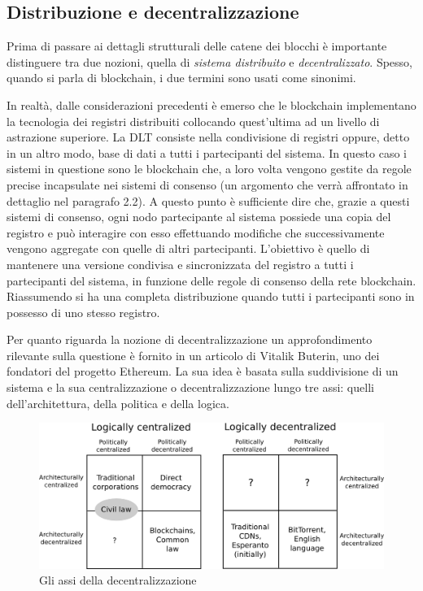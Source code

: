 \subsection{Distribuzione e decentralizzazione}

Prima di passare ai dettagli strutturali delle catene dei blocchi è importante distinguere tra due nozioni, quella di \emph{sistema distribuito} e \emph{decentralizzato}. Spesso, quando si parla di blockchain, i due termini sono usati come sinonimi. 

In realtà, dalle considerazioni precedenti è emerso che le blockchain implementano la tecnologia dei registri distribuiti collocando quest’ultima ad un livello di astrazione superiore. La DLT consiste nella condivisione di registri oppure, detto in un altro modo, base di dati a tutti i partecipanti del sistema. In questo caso i sistemi in questione sono le blockchain che, a loro volta vengono gestite da regole precise incapsulate nei sistemi di consenso (un argomento che verrà affrontato in dettaglio nel paragrafo 2.2). A questo punto è sufficiente dire che, grazie a questi sistemi di consenso, ogni nodo partecipante al sistema possiede una copia del registro e può interagire con esso effettuando modifiche che successivamente vengono aggregate con quelle di altri partecipanti. L’obiettivo è quello di mantenere una versione condivisa e sincronizzata del registro a tutti i partecipanti del sistema, in funzione delle regole di consenso della rete blockchain. Riassumendo si ha una completa distribuzione quando tutti i partecipanti sono in possesso di uno stesso registro.

Per quanto riguarda la nozione di decentralizzazione un approfondimento rilevante sulla questione è fornito in un articolo di Vitalik Buterin, uno dei fondatori del progetto Ethereum. La sua idea è basata sulla suddivisione di un sistema e la sua centralizzazione o decentralizzazione lungo tre assi: quelli dell’architettura, della politica e della logica.
\\
\begin{figure}[H]
\centering
\includegraphics[width=1\textwidth]{immagini/meaning_decentralization.png}
\caption{Gli assi della decentralizzazione}
\label{fig:AssiDecentralizzazione}

\end{figure}

